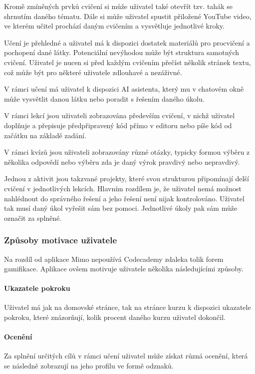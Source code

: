Kromě zmíněných prvků cvičení si může uživatel také otevřít tzv. tahák se shrnutím daného tématu. Dále si může uživatel spustit přiložené YouTube video, ve kterém učitel prochází daným cvičením a vysvětluje jednotlivé kroky.

Učení je přehledné a uživatel má k dispozici dostatek materiálů pro procvičení a pochopení dané látky. Potenciální nevýhodou může být struktura samotných cvičení. Uživatel je nucen si před každým cvičením přečíst několik stránek textu, což může být pro některé uživatele zdlouhavé a nezáživné.

V rámci učení má uživatel k dispozici AI asistenta, který mu v chatovém okně může vysvětlit danou látku nebo poradit s řešením daného úkolu. 

V rámci lekcí jsou uživateli zobrazována především cvičení, v nichž uživatel doplňuje a přepisuje předpřipravený kód přímo v editoru nebo píše kód od začátku na základě zadání. 

V rámci kvízů jsou uživateli zobrazovány různé otázky, typicky formou výběru z několika odpovědí nebo výběru zda je daný výrok pravdivý nebo nepravdivý.

Jednou z aktivit jsou takzvané projekty, které svou strukturou připomínají delší cvičení v jednotlivých lekcích. Hlavním rozdílem je, že uživatel nemá možnost nahlédnout do správného řešení a jeho řešení není nijak kontrolováno. Uživatel tak musí daný úkol vyřešit sám bez pomoci. Jednotlivé úkoly pak sám může označit za splněné.  

\subsubsection{Způsoby motivace uživatele}

Na rozdíl od aplikace Mimo nepoužívá Codecademy zdaleka tolik forem gamifikace. Aplikace ovšem motivuje uživatele několika následujícími způsoby.

\paragraph{Ukazatele pokroku} Uživatel má jak na domovské stránce, tak na stránce kurzu k dispozici ukazatele pokroku, které znázorňují, kolik procent daného kurzu uživatel dokončil. 

\paragraph{Ocenění} Za splnění určitých cílů v rámci učení uživatel může získat různá ocenění, která se následně zobrazují na jeho profilu ve formě odznaků.


